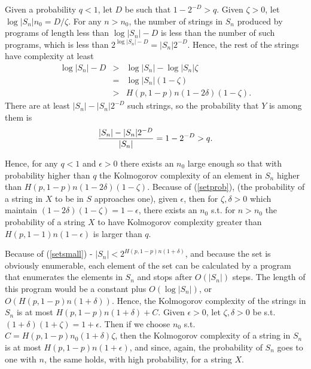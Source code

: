 \documentclass[11pt]{article} \usepackage{amssymb}
\begin{document}
\begin{enumerate}
  Given a probability $q<1$, let $D$ be such that $1-2^{-D}>q$.
  Given $\zeta>0$, let $\log|S_n|n_0=D/\zeta$.   
  For any $n>n_0$, the number of strings in $S_n$ produced by programs of 
  length less than  $\log|S_n|-D$ is less than the number of such programs, 
  which is less than $2^{\log|S_n|-D}=|S_n|2^{-D}$. 
  Hence, the rest of the strings have complexity
  at least
  \begin{eqnarray*}
    \log|S_n|-D&>&\log|S_n|-\log|S_n|\zeta
    \\ &=&\log|S_n|(1-\zeta)
    \\ &>&H(p,1-p)n(1-2\delta)(1-\zeta).
  \end{eqnarray*}
  There are at least $|S_n|-|S_n|2^{-D}$ 
  such strings, so the probability that $Y$  is among them is
  \begin{equation*}
    {|S_n|-|S_n|2^{-D} \over |S_n|}=1-2^{-D}>q.           
  \end{equation*}
 
  Hence, for any $q<1$ and $\epsilon>0$ there exists an $n_0$ large enough
  so that with probability higher than $q$ the Kolmogorov complexity of
  an element in $S_n$ higher than $H(p,1-p)n(1-2\delta)(1-\zeta)$. 
  Because of (\ref{setprob}), 
  (the probability of a string in $X$ to be in $S$ approaches one), 
  given $\epsilon$, then for $\zeta,\delta>0$ which maintain
  $(1-2\delta)(1-\zeta)=1-\epsilon$, there exists an $n_0$ s.t. 
  for $n>n_0$ the probability
  of a string $X$ to have Kolmogorov complexity greater than 
  $H(p,1-1)n(1-\epsilon)$ is larger than $q$.
  
  Because of (\ref{setsmall}) - $|S_n|<2^{H(p,1-p)n(1+\delta)}$, and because
  the set is obviously enumerable, each element of the set can be calculated
  by a program that enumerates the elements in $S_n$ and stops after
  $O(|S_n|)$ steps. The length of this program would be a constant
  plus $O(\log|S_n|)$, or $O(H(p,1-p)n(1+\delta))$. Hence, the Kolmogorov
  complexity of the strings in $S_n$ is at most $H(p,1-p)n(1+\delta)+C$. Given
  $\epsilon>0$, let $\zeta,\delta>0$ be s.t. $(1+\delta)(1+\zeta)=1+\epsilon$. 
  Then if we choose $n_0$ s.t. $C=H(p,1-p)n_0(1+\delta)\zeta$, then the Kolmogorov
  complexity of a string in $S_n$ is at most $H(p,1-p)n(1+\epsilon)$, 
  and since, again, the probability of $S_n$ goes to one with $n$, 
  the same holds, with high probability, for a string $X$.
  
\end{enumerate}
\end{document}
